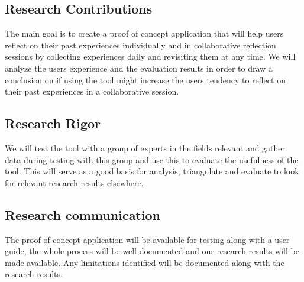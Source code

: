 \subsection{Research Contributions}
The main goal is to create a proof of concept application that will help users reflect on their past experiences individually and in collaborative reflection sessions by collecting experiences daily and revisiting them at any time. We will analyze the users experience and the evaluation results in order to draw a conclusion on if using the tool might increase the users tendency to reflect on their past experiences in a collaborative session.

\subsection{Research Rigor}
We will test the tool with a group of experts in the fields relevant and gather data during testing with this group and use this to evaluate the usefulness of
the tool. This will serve as a good basis for analysis, triangulate and evaluate to look for relevant research results elsewhere.

\subsection{Research communication}
The proof of concept application will be available for testing along with a user guide, the whole process will be well documented and our research results will be made available.
Any limitations identified  will be documented along with the research results. 



